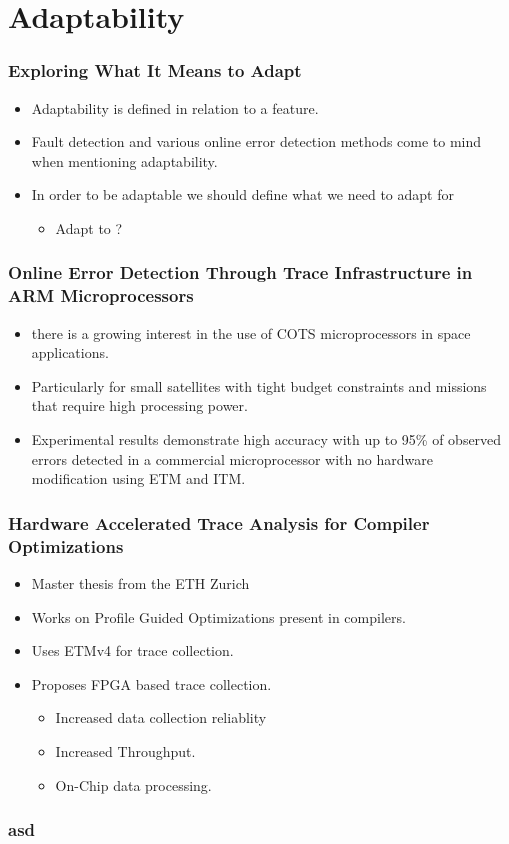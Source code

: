 \documentclass{beamer}
\begin{document}
\section{Adaptability}
\begin{frame}
    \frametitle{Exploring What It Means to Adapt}
    \begin{itemize}
        \item Adaptability is defined in relation to a feature.
        \item Fault detection and various online error detection methods come
            to mind when mentioning adaptability.
        \item In order to be adaptable we should define what we need to adapt
            for
            \begin{itemize}
                \item Adapt to ?
            \end{itemize}
    \end{itemize}
\end{frame}
\begin{frame}
    \frametitle{Online Error Detection Through Trace Infrastructure in
    ARM Microprocessors}
    \begin{itemize}
        \item there is a growing interest in the use of COTS microprocessors
            in space applications.
        \item Particularly for small satellites with tight budget constraints
            and missions that require high processing power.
        \item Experimental results demonstrate high accuracy with up to 95\% 
            of observed errors detected in a commercial microprocessor with
            no hardware modification using ETM and ITM.
    \end{itemize}
\end{frame}
\begin{frame}
    \frametitle{Hardware Accelerated Trace Analysis for Compiler Optimizations}
    \begin{itemize}
        \item Master thesis from the ETH Zurich
        \item Works on Profile Guided Optimizations present in compilers.
        \item Uses ETMv4 for trace collection.
        \item Proposes FPGA based trace collection.
            \begin{itemize}
                \item Increased data collection reliablity
                \item Increased Throughput.
                \item On-Chip data processing.
            \end{itemize}
    \end{itemize}
\end{frame}
\begin{frame}
    \frametitle{asd}
\end{frame}
\end{document}
